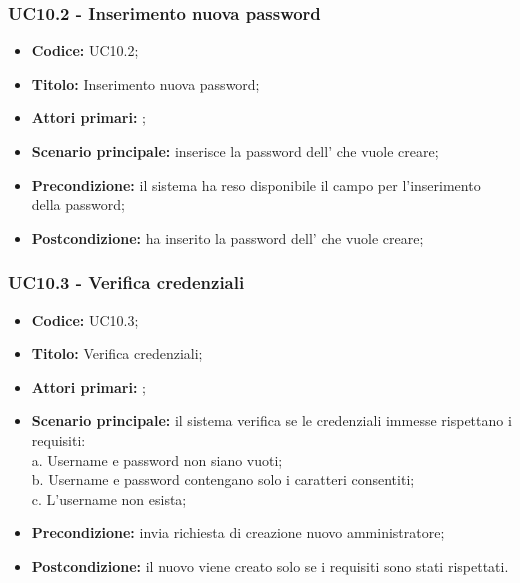 \documentclass[casi-duso]{subfiles}
\begin{document}
\subsubsection{UC10.2 - Inserimento nuova password}
\label{subsub:UC10.2}
\begin{itemize}
  \item \textbf{Codice:} UC10.2;
  \item \textbf{Titolo:} Inserimento nuova password;
  \item \textbf{Attori primari:} ;
  \item \textbf{Scenario principale:}  inserisce la password dell' che vuole creare;
  \item \textbf{Precondizione:} il sistema ha reso disponibile il campo per l'inserimento della password;
  \item \textbf{Postcondizione:}  ha inserito la password dell' che vuole creare;
\end{itemize}


\subsubsection{UC10.3 - Verifica credenziali}
\label{subsub:UC10.3}
\begin{itemize}
  \item \textbf{Codice:} UC10.3;
  \item \textbf{Titolo:} Verifica credenziali;
  \item \textbf{Attori primari:} ;
  \item \textbf{Scenario principale:} il sistema verifica se le credenziali immesse rispettano i requisiti:
  \\a. Username e password non siano vuoti;
  \\b. Username e password contengano solo i caratteri consentiti;
  \\c. L'username non esista;
  \item \textbf{Precondizione:}  invia richiesta di creazione nuovo amministratore;
  \item \textbf{Postcondizione:} il nuovo  viene creato solo se i requisiti sono stati rispettati.
\end{itemize}
\end{document}
